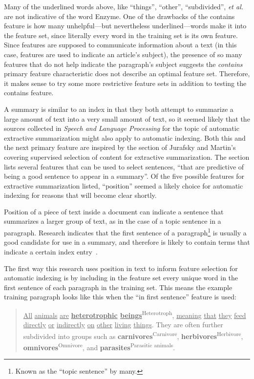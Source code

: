 Many of the underlined words above, like ``things'', ``other'', ``subdivided'', {\it et al.} are not indicative of the word Enzyme.
One of the drawbacks of the contains feature is how many unhelpful---but nevertheless underlined---words make it into the feature set, since literally every word in the training set is its own feature.
Since features are supposed to communicate information about a text (in this case, features are used to indicate an article's subject), the presence of so many features that do not help indicate the paragraph's subject suggests the {\it contains} primary feature characteristic does not describe an optimal feature set.
Therefore, it makes sense to try some more restrictive feature sets in addition to testing the contains feature.


A summary is similar to an index in that they both attempt to summarize a large amount of text into a very small amount of text, so it seemed likely that the sources collected in {\it Speech and Language Processing} for the topic of automatic extractive summarization might also apply to automatic indexing.
Both this and the next primary feature are inspired by the section of Jurafsky and Martin's covering supervised selection of content for extractive summarization.
The section lists several features that can be used to select sentences, ``that are predictive of being a good sentence to appear in a summary''.
Of the five possible features for extractive summarization listed, ``position'' seemed a likely choice for automatic indexing for reasons that will become clear shortly.

Position of a piece of text inside a document can indicate a sentence that summarizes a larger group of text, as in the case of a topic sentence in a paragraph.
Research indicates that the first sentence of a paragraph\footnote{Known as the ``topic sentence'' by many.} is usually a good candidate for use in a summary, and therefore is likely to contain terms that indicate a certain index entry~\cite{jurafsky}.

The first way this research uses position in text to inform feature selection for automatic indexing is by including in the feature set every unique word in the first sentence of each paragraph in the training set.
This means the example training paragraph looks like this when the ``in first sentence'' feature is used:

\begin{quote}
\underline{All} \underline{animals} \underline{are} {\bf \underline{heterotrophic} \underline{beings}}\textsuperscript{Heterotroph}, \underline{meaning} \underline{that} \underline{they} \underline{feed} \underline{directly} \underline{or} \underline{indirectly} \underline{on} \underline{other} \underline{living} \underline{things}. They are often further subdivided into groups such as {\bf carnivores}\textsuperscript{Carnivore}, {\bf herbivores}\textsuperscript{Herbivore}, {\bf omnivores}\textsuperscript{Omnivore}, and {\bf parasites}\textsuperscript{Parasitic animals}.
\end{quote} 

